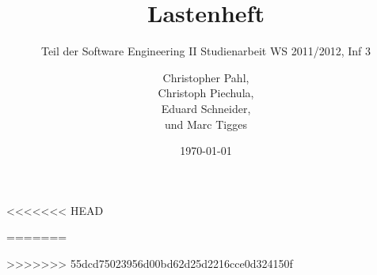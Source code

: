 \documentclass[11pt]{scrreprt}%
\title{Lastenheft}
\subtitle{Teil der Software Engineering II Studienarbeit WS 2011/2012, Inf 3}
\author{
Christopher Pahl,\\
Christoph Piechula,\\
Eduard Schneider,\\
und Marc Tigges}
\date{\today}
\begin{document}
\maketitle
\tableofcontents
<<<<<<< HEAD







=======










>>>>>>> 55dcd75023956d00bd62d25d2216cce0d324150f
\end{document}
